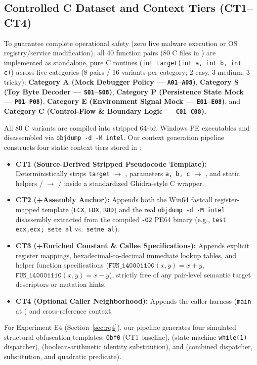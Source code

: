 \documentclass[runningheads]{llncs}
\begin{document}
\subsection{Controlled C Dataset and Context Tiers (CT1--CT4)}
To guarantee complete operational safety (zero live malware execution or OS registry/service modification), all 40 function pairs (80 C files in ) are implemented as standalone, pure C routines (\texttt{int target(int a, int b, int c)}) across five categories (8 pairs / 16 variants per category; 2 easy, 3 medium, 3 tricky): \textbf{Category A (Mock Debugger Policy --- \texttt{A01}--\texttt{A08})}, \textbf{Category S (Toy Byte Decoder --- \texttt{S01}--\texttt{S08})}, \textbf{Category P (Persistence State Mock --- \texttt{P01}--\texttt{P08})}, \textbf{Category E (Environment Signal Mock --- \texttt{E01}--\texttt{E08})}, and \textbf{Category C (Control-Flow \& Boundary Logic --- \texttt{C01}--\texttt{C08})}.

All 80 C variants are compiled into stripped 64-bit Windows PE executables and disassembled via \texttt{objdump -d -M intel}. Our context generation pipeline constructs four static context tiers stored in :
\begin{itemize}
    \item \textbf{CT1 (Source-Derived Stripped Pseudocode Template):} Deterministically strips \texttt{target} $\rightarrow$ , parameters \texttt{a, b, c} $\rightarrow$ , and static helpers / $\rightarrow$ / inside a standardized Ghidra-style C wrapper.
    \item \textbf{CT2 (+Assembly Anchor):} Appends both the Win64 fastcall register-mapped template (\texttt{ECX}, \texttt{EDX}, \texttt{R8D}) and the real \texttt{objdump -d -M intel} disassembly extracted from the compiled \texttt{-O2} PE64 binary (e.g., \texttt{test ecx,ecx; sete al} vs.\ \texttt{setne al}).
    \item \textbf{CT3 (+Enriched Constant \& Callee Specifications):} Appends explicit register mappings, hexadecimal-to-decimal immediate lookup tables, and helper function specifications ($\texttt{FUN\_140001100}(x,y) = x+y$, $\texttt{FUN\_140001110}(x,y) = x-y$), strictly free of any pair-level semantic target descriptors or mutation hints.
    \item \textbf{CT4 (Optional Caller Neighborhood):} Appends the caller harness (\texttt{main} at ) and cross-reference context.
\end{itemize}
For Experiment E4 (Section~\ref{sec:rq4}), our pipeline generates four simulated structural obfuscation templates: \texttt{Obf0} (CT1 baseline),  (state-machine \texttt{while(1)} dispatcher),  (boolean-arithmetic identity substitution), and  (combined dispatcher, substitution, and quadratic predicate).
\end{document}
